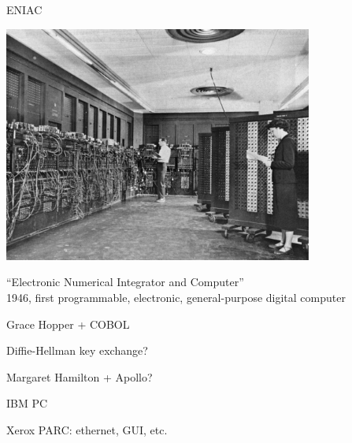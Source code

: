\documentclass[xcolor={usenames,dvipsnames,svgnames,table},12pt]{beamer}
\begin{document}
\begin{frame}{ENIAC}
  \begin{center}
    \includegraphics[width=4in]{Eniac}
  \end{center}

  ``Electronic Numerical Integrator and Computer'' \\
  1946, first programmable, electronic, general-purpose digital computer
\end{frame}

\begin{frame}{Grace Hopper + COBOL}

\end{frame}

\begin{frame}{Diffie-Hellman key exchange?}

\end{frame}

\begin{frame}{Margaret Hamilton + Apollo?}

\end{frame}

\begin{frame}{IBM PC}

\end{frame}

\begin{frame}{Xerox PARC: ethernet, GUI, etc.}

\end{frame}
\end{document}
